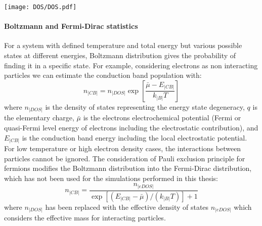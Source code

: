 		\begin{SCfigure}
			\centering
			\texttt{[image: DOS/DOS.pdf]}
			\label{fig:DOS}
		\end{SCfigure}


		\paragraph{Boltzmann and Fermi-Dirac statistics}\label{intro_statistics}
		For a system with defined temperature and total energy but various possible states at different energies, Boltzmann distribution gives the probability of finding it in a specific state.
		For example, considering electrons as non interacting particles we can estimate the conduction band population with:
		\begin{equation}\label{eq:boltzmann}
			n_|CB| = n_|DOS|\exp[\frac{\bar\mu-E_|CB|}{k_|B|T}]
		\end{equation}
		where $n_|DOS|$ is the density of states representing the energy state degeneracy, $q$ is the elementary charge, $\bar\mu$ is the electrons electrochemical potential (Fermi or quasi\hyp{}Fermi level energy of electrons including the electrostatic contribution), and $E_|CB|$ is the conduction band energy including the local electrostatic potential.
		For low temperature or high electron density cases, the interactions between particles cannot be ignored.
		The consideration of Pauli exclusion principle for fermions modifies the Boltzmann distribution into the Fermi\hyp{}Dirac distribution, which has not been used for the simulations performed in this thesis:
		\begin{equation}\label{eq:fermidirac}
			n_|CB| = \frac{n_|eDOS|}{\exp[(E_|CB|-\bar\mu)/(k_|B|T)]+1}
		\end{equation}
		where $n_|DOS|$ has been replaced with the effective density of states $n_|eDOS|$ which considers the effective mass for interacting particles.

